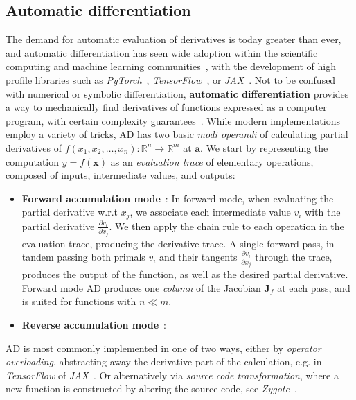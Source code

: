 \subsection{Automatic differentiation}
\label{subsec:autodiff}
The demand for automatic evaluation of derivatives is today greater than ever, and automatic differentiation has seen wide adoption within the scientific computing and machine learning communities~\cite{lyu2013automatic, tamayo2018automatic, baydin2018automatic}, with the development of high profile libraries such as \emph{PyTorch}~\cite{paszke2017automatic}, \emph{TensorFlow}~\cite{abadi2016tensorflow}, or \emph{JAX}~\cite{jax2018github}. Not to be confused with numerical or symbolic differentiation, \textbf{automatic differentiation} provides a way to mechanically find derivatives of functions expressed as a computer program, with certain complexity guarantees~\cite{barak2016history}. While modern implementations employ a variety of tricks, AD has two basic \emph{modi operandi} of calculating partial derivatives of $f(x_1, x_2, \ldots, x_n): \mathbb{R}^n \rightarrow \mathbb{R}^m$ at $\mathbf{a}$. We start by representing the computation $y = f(\mathbf{x})$ as an \emph{evaluation trace} of elementary operations, composed of inputs, intermediate values, and outputs:
\begin{itemize}
	\item \textbf{Forward accumulation mode}~\cite{wengert1964simple}:  In forward mode, when evaluating the partial derivative w.r.t $x_j$, we associate each intermediate value $v_i$ with the partial derivative $\frac{\partial v_i}{\partial x_j}$. We then apply the chain rule to each operation in the evaluation trace, producing the derivative trace. A single forward pass, in tandem passing both primals $v_i$ and their tangents $\frac{\partial v_i}{\partial x_j}$ through the trace, produces the output of the function, as well as the desired partial derivative. Forward mode AD produces one \emph{column} of the Jacobian $\textbf{J}_f$ at each pass, and is suited for functions with $n \ll m$.
	
	\item \textbf{Reverse accumulation mode}~\cite{speelpenning1980compiling}:
\end{itemize}
AD is most commonly implemented in one of two ways, either by \emph{operator overloading}, abstracting away the derivative part of the calculation, e.g. in \emph{TensorFlow} of \emph{JAX}~\cite{abadi2016tensorflow, jax2018github}. Or alternatively via \emph{source code transformation}, where a new function is constructed by altering the source code, see \emph{Zygote}~\cite{innes2018don}.

